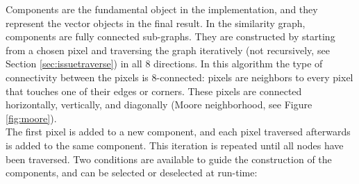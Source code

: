 \documentclass[]{usiinfbachelorproject}
\begin{document}
Components are the fundamental object in the implementation, and they represent the vector objects in the final result. In the similarity graph, components are fully connected sub-graphs. They are constructed by starting from a chosen pixel and traversing the graph iteratively (not recursively, see Section \ref{sec:issuetraverse}) in all 8 directions. In this algorithm the type of connectivity between the pixels is 8-connected: pixels are neighbors to every pixel that touches one of their edges or corners. These pixels are connected horizontally, vertically, and diagonally (Moore neighborhood, see Figure \ref{fig:moore}).\\
The first pixel is added to a new component, and each pixel traversed afterwards is added to the same component. This iteration is repeated until all nodes have been traversed. Two conditions are available to guide the construction of the components, and can be selected or deselected at run-time:
\end{document}
